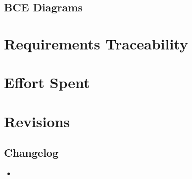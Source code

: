 \documentclass[english]{article}
\begin{document}
\subsection{BCE Diagrams}

\newpage

\section{Requirements Traceability}

\newpage

\section{Effort Spent}

\newpage

\section{Revisions}

\subsection{Changelog}
\begin{itemize}
  \item{}
\end{itemize}
\end{document}
